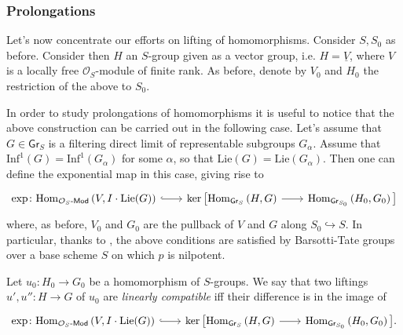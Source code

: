 \documentclass[../Main]{subfiles}
\begin{document}
\subsubsection{Prolongations}
Let's now concentrate our efforts on lifting of homomorphisms.
Consider $S, S_0$ as before.
Consider then $H$ an $S$-group given as a vector group,
i.e. $H = \underline{V}$, where $V$ is a locally free $\mathcal{O}_{ S }$-module
of finite rank.
As before, denote by $V_0$ and $H_0$ the restriction of the above to $S_0$.


\begin{rem}
	In order to study prolongations of homomorphisms it is useful to notice that
	the above construction can be carried out in the following case.
	Let's assume that $G \in \mathsf{Gr}_S$ is a filtering direct limit of
	representable subgroups $G_\alpha$.
	Assume that $\mathrm{Inf}^1(G) = \mathrm{Inf}^1(G_\alpha)$ for some $\alpha$,
	so that $\mathrm{Lie}(G) = \mathrm{Lie}(G_\alpha)$.
	Then one can define the exponential map in this case, giving rise to
	\begin{equation*}
	\begin{tikzcd}[row sep = 0ex, column sep = 2.0em
		,/tikz/column 1/.append style={anchor=base east}
		,/tikz/column 2/.append style={anchor=base west}]
		\exp\colon
		\mathrm{Hom}_{ \mathcal{O}_{ S }\text{-}\mathsf{Mod} }
		\left( V, I \cdot \mathrm{Lie}(G) \right)
		\arrow[r, "", hookrightarrow] &
		\ker \big[ 
		\mathrm{Hom}_{ \mathsf{Gr}_S } 
		\left( H, G \right)
		\arrow[r, "", rightarrow] &
		\mathrm{Hom}_{ \mathsf{Gr}_{S_0} }
		\left( H_0, G_0 \right)
		\big]
	\end{tikzcd}
	\end{equation*} 
	where, as before, $V_0$ and $G_0$ are the pullback of $V$ and $G$ 
	along $S_0 \hookrightarrow S$.
	In particular, thanks to \cite[Chapter II, Corollary 3.3.16]{Messing},
	the above conditions are satisfied by Barsotti-Tate
	groups over a base scheme $S$ on which $p$ is nilpotent.
\end{rem}


\begin{defn}
	Let $u_0\colon H_0 \to G_0$ be a homomorphism of $S$-groups.
	We say that two liftings $u', u''\colon H \to G$ of $u_0$
	are {\em linearly compatible} iff their difference is in the image
	of 
	\begin{equation*}
	\begin{tikzcd}[row sep = 0ex, column sep = 2.0em
		,/tikz/column 1/.append style={anchor=base east}
		,/tikz/column 2/.append style={anchor=base west}]
		\exp\colon
		\mathrm{Hom}_{ \mathcal{O}_{ S }\text{-}\mathsf{Mod} }
		\left( V, I \cdot \mathrm{Lie}(G) \right)
		\arrow[r, "", hookrightarrow] &
		\ker \big[ 
		\mathrm{Hom}_{ \mathsf{Gr}_S } 
		\left( H, G \right)
		\arrow[r, "", rightarrow] &
		\mathrm{Hom}_{ \mathsf{Gr}_{S_0} }
		\left( H_0, G_0 \right)
		\big]
	.\end{tikzcd}
	\end{equation*} 
\end{defn}
\end{document}
